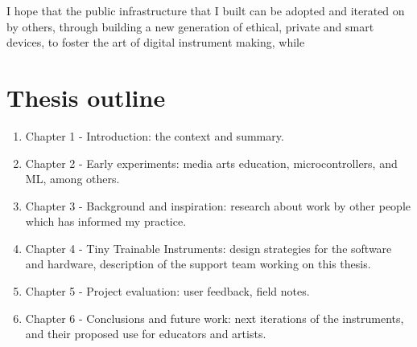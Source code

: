 I hope that the public infrastructure that I built can be adopted and iterated on by others, through building a new generation of ethical, private and smart devices, to foster the art of digital instrument making, while 

\section{Thesis outline}

\begin{enumerate}
  \item Chapter 1 - Introduction: the context and summary.
  \item Chapter 2 - Early experiments: media arts education, microcontrollers, and \acrshort{ML}, among others.
  \item Chapter 3 - Background and inspiration: research about work by other people which has informed my practice.
  \item Chapter 4 - Tiny Trainable Instruments: design strategies for the software and hardware, description of the support team working on this thesis.
  \item Chapter 5 - Project evaluation: user feedback, field notes.
  \item Chapter 6 - Conclusions and future work: next iterations of the instruments, and their proposed use for educators and artists.
  \end{enumerate}
